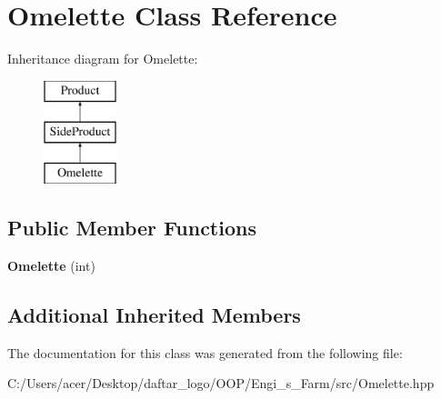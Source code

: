 \hypertarget{class_omelette}{}\section{Omelette Class Reference}
\label{class_omelette}
Inheritance diagram for Omelette\+:\begin{figure}[H]
\begin{center}
\leavevmode
\includegraphics[height=3.000000cm]{class_omelette}
\end{center}
\end{figure}
\subsection*{Public Member Functions}
\begin{DoxyCompactItemize}
\item 
\mbox{\label{class_omelette_a3202e000c3e4ac83768f977f5c0197d7}} 
{\bfseries Omelette} (int)
\end{DoxyCompactItemize}
\subsection*{Additional Inherited Members}


The documentation for this class was generated from the following file\+:\begin{DoxyCompactItemize}
\item 
C\+:/\+Users/acer/\+Desktop/daftar\+\_\+logo/\+O\+O\+P/\+Engi\+\_\+s\+\_\+\+Farm/src/Omelette.\+hpp\end{DoxyCompactItemize}
